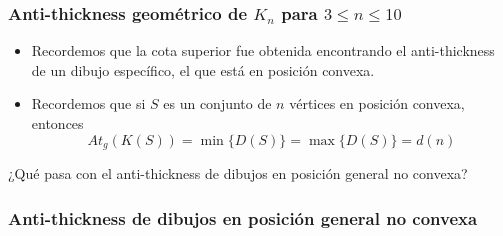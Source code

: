 \begin{frame}
\frametitle{Anti-thickness geométrico de $K_n$ para $3\leq n\leq 10$}
\begin{itemize}
	\item[] Recordemos que la cota superior fue obtenida encontrando el anti-thickness de un dibujo específico, el que está en posición convexa.
	\item[] Recordemos que si $S$ es un conjunto de $n$ vértices en posición convexa, entonces \[ At_g(K(S)) = \min\{D(S)\} = \max\{D(S)\} = d(n)\]
\end{itemize}
¿Qué pasa con el anti-thickness de dibujos en posición general no convexa?
\end{frame}

\begin{frame}
\frametitle{Anti-thickness de dibujos en posición general no convexa}
\end{frame}